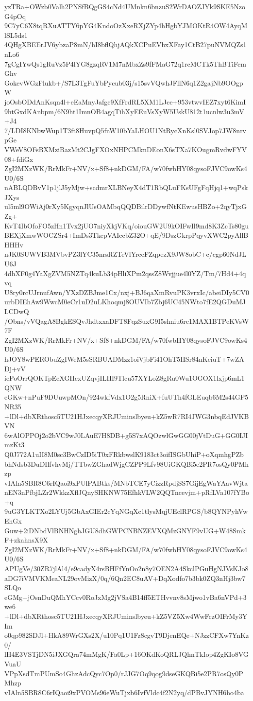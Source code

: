 yzTRa+OWzb0Valh2PNSfBQgGS4cNd4UMnkn6bnzuS2WrDAOZJYk9SKE5NzoG4pOq
9C7yC6X8tqRXuATTY6pYG4KndoOzXxeRXjZYp4hHgbYJMOKtR4OW4AyqMlSL5ds1
4QHgXBEErJV6ybzaP8mN/hI8bflQhjAQkXCPuEVbxXFay1CtB27puNVMQZs1nLo6
7gCgIYwQs1gRuVz5P4lYG8gzqRV1M7nMbxZs9fFMaG72q1rcMCTk5ThBTiFcmGhv
GokevWGzFlukb+/S7L3TgFuYbPycub03j/s15svVQwhJFllN6q1Z2gajNb9OOgpW
joOsbODdAnKsqn4l+eEaMnyJafgc9XfFrdRL5XM1LJce+953vtwvIEZ7xyt6KimI
9htGxdKAnbpm/6N9ht1ImnOB4agqTihXyEEuVsXyW5UskU812t1ucnlw3u3mV+J4
7/LDI8KNbwWup1T3ft8HuvpQ5fnW10bYaLHOU1NtRycXnKsl0SVJop7JW8nrvpGe
VWeV8OFsBXMziBazMt2CJgFXOxNHPCMknDEonX6sTXa7KOugmRvdwFYV08+fdiGx
ZgI2MXzWK/RrMkFr+NV/x+Sf8+nkDGM/FA/w70fwbHY08qysoFJVC9owKs4U0/6S
nABLQDBvV1p1jlJ5yMjw+scdmrXLBNeyX4dT1RbQLuFKsUFgFqHjq1+wqPskJXys
ul5ml9OWiAj0rXy5KgyqnJlUsOAMbqQQDBilrDDywfNtKEwusHBZo+2qyTjxGZg+
KvT4IbOfoFO5zHn1Tvx2jUO7niyXkjVKq/oiouGW2U9kOIFwIl9md8K3ZcTs80gu
BEXjXmwWOCZSr4+ImDs3TkepVAIccbZ32O+qE/9DszGkrpPqyvXWC2pyAllBHHHv
nJK0SUWVB3MVbvPZ3lYC35nrsRZTeVlYreeFZqpezX9JW8obC+c/cgp60NdJLU6J
4dhXF0g4YaXgZVM5NZTq4kuLb34pHliXPm2qssZ8Wvjjue4l0YZ/Tm/7Hd4+4qvq
U8ry0rcUJrnufAwn/YXzDZBJme1Cx/nxj+BJ6qaXmRvuPK3vrxIc/abeiDIy5CV0
urbDIEhAw9WwcM0eCr1uD2uLKhoqmj8OUVIb7Zbj6UC45NWto7fE2QGDuMJLCDwQ
/Obns/vVQagA8BgkESQvJhdtxxaDFT8FqzSuxG9I5shniu6rc1MAX1BTPeKVsW7F
ZgI2MXzWK/RrMkFr+NV/x+Sf8+nkDGM/FA/w70fwbHY08qysoFJVC9owKs4U0/6S
hJOY8wPERObuZgIWeM5sSRBUADMzz1oiVjbFi41OhT5HSr84nKeiuT+7wZADj+vV
iePoOrrQOKTpEeXGHcxUZqvjILHI9Tlcu57XYLoZ8gRu0Wu1OGOX1lxjp6mL1QNW
eGKw+nPuF9DUuwpMOn/924wkfVdx1O2g5RniX+fuUTh4fGLEuqb6M2s44GP5NR35
+lDl+dbXRthosc5TU21HJxecqyXRJUminslbyeu+kZ5wR7RI4JWG3nbqEdJVKBVN
6wAlOPPOj2o2bVC9wJ0LAuE7H8DB+g5S7xAQOzwlGwGG00jVtDuG+GG0IJImzKt3
Q0J772A1uII8M0sc3BwCzID5iT0xFRkbwslK9183ct3oifISGbUhiP+oXqmhgPZb
bhNdsb3DuDIlfvhvMj/TTbwZGhadWjgCZPP9Lfv98UiGKQBi5e2PR7osQy0PMhzp
vIAln5SBR8C6rIQaoi9xPUlPABtks/MNbTCE7yCizzRpdjSS7GijEgWaYAavWjta
nEN3nPfbjLZr2WkkzXflJQnySHKNW75EfhkVLW2QQTncevjm+pRfLVa107fYBo+q
9uG3YLKTXo2LYUj5GbAxGIEr2cYqNGqXc1tlysMqjUEclRPGS/b8QYNPyhVwEhGx
Guw+2iDNbdVlBNHNghJGU8dhGWPCNBNZEVXQMzGNYF9vUG+W48SmkF+zkahnsX9X
ZgI2MXzWK/RrMkFr+NV/x+Sf8+nkDGM/FA/w70fwbHY08qysoFJVC9owKs4U0/6S
APUgVe/30ZR7jlAl4/e9cadyX4rsBHFfYnOo2n8y7OEN2A4SkclPGuHgNJVsKJo8
aDG7iVMVKMeaNL29ovMizX/0q/6Qn2EC8uAV+DqXodfo7b3bk0ZQ3nHj3bw7SLQo
eGMg+jOsnDuQMhYCcv0RoJxMg2jVSa4B14ff5ETHvvnv8sMjwo1vBa6nVPd+3we6
+lDl+dbXRthosc5TU21HJxecqyXRJUminslbyeu+kZ5VZ5Xw4WwFczOIFrMy3YIm
o0qp982SDJl+HkA89WrGXs2X/u10Pq1U1Fz8cgvT9DjenEQe+NJzzCFXw7YnKz0/
lH4E3VSTjDN5iJXGQra74mMgK/Fa0Lp+16OKdKoQRLJQhnTkIop4ZgKIo8VGVuaU
VPpXsdTmPUmSo4GhzAdcQyc7Op0/rJJG7Oq9qog9dseGKQBi5e2PR7osQy0PMhzp
vIAln5SBR8C6rIQaoi9xPVOMs96eWuTjxb6IvfVldc4f2N2yq/dPBvJYNH6ho4ba
